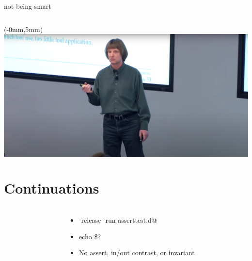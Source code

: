 \documentclass[aspectratio=169,notes]{beamer}
\begin{document}
	\begin{frame}[fragile]{not being smart}
		\begin{columns}[T]
		\begin{column}{0.49\textwidth}
		
		\end{column}
		\begin{column}{0.49\textwidth}
		
		\end{column}
		\end{columns}
	\end{frame}

	\begin{frame}[plain]
  		\begin{textblock*}{0cm}(-0mm,5mm)
		\hspace{-5mm}\includegraphics[width=\paperwidth]{scott.png}
		\end{textblock*}
	\end{frame}

	\section{Continuations}

	\begin{frame}[t]
		\frametitle{\lstinline@assert@s}
		\begin{columns}[T]
		\begin{column}{0.49\textwidth}
		
		\end{column}
		\begin{column}{0.49\textwidth}
		
		\begin{itemize}
			\item \lstinline@dmd -release -run asserttest.d@
			\item echo \$?
			\pause
			 \vspace{10mm}\item No assert, in/out contrast, or invariant
		\end{itemize}
		\end{column}
		\end{columns}
	\end{frame}
\end{document}

